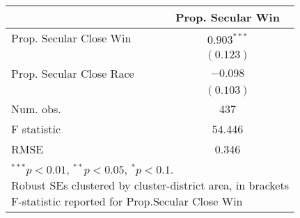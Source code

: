 
\begin{tabular}{l c }
\hline
 & Prop. Secular Win \\
\hline
Prop. Secular Close Win  & $0.903^{***}$ \\
                         & $(0.123)$     \\
Prop. Secular Close Race & $-0.098$      \\
                         & $(0.103)$     \\
\hline
Num. obs.                & 437           \\
F statistic              & 54.446        \\
RMSE                     & 0.346         \\
\hline
\multicolumn{2}{l}{\scriptsize{\parbox{.4\linewidth}{\vspace{2pt}$^{***}p<0.01$, $^{**}p<0.05$, $^*p<0.1$. \\
       Robust SEs clustered by cluster-district area, in brackets\\ F-statistic reported for Prop.Secular Close Win}}}
\end{tabular}

